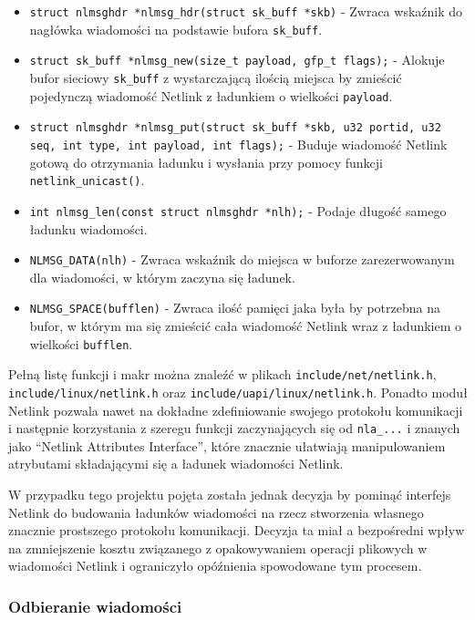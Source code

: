 \documentclass[10pt]{article}
\begin{document}
\begin{itemize}
\itemsep1pt\parskip0pt
\item
  \texttt{struct nlmsghdr *nlmsg\_hdr(struct sk\_buff *skb)} - Zwraca wskaźnik do nagłówka wiadomości na podstawie bufora \texttt{sk\_buff}.
\item
  \texttt{struct sk\_buff *nlmsg\_new(size\_t payload, gfp\_t flags);} - Alokuje bufor sieciowy \texttt{sk\_buff} z wystarczającą ilością miejsca by zmieścić pojedynczą wiadomość Netlink z ładunkiem o wielkości \texttt{payload}.
\item
  \texttt{struct nlmsghdr *nlmsg\_put(struct sk\_buff *skb, u32 portid, u32 seq, int type, int payload, int flags);} - Buduje wiadomość Netlink gotową do otrzymania ładunku i wysłania przy pomocy funkcji \texttt{netlink\_unicast()}.
\item
  \texttt{int nlmsg\_len(const struct nlmsghdr *nlh);} - Podaje długość samego ładunku wiadomości.
\item
  \texttt{NLMSG\_DATA(nlh)} - Zwraca wskaźnik do miejsca w buforze zarezerwowanym dla wiadomości, w którym zaczyna się ładunek.
\item
  \texttt{NLMSG\_SPACE(bufflen)} - Zwraca ilość pamięci jaka była by potrzebna na bufor, w którym ma się zmieścić cała wiadomość Netlink wraz z ładunkiem o wielkości \texttt{bufflen}.
\end{itemize}

Pełną listę funkcji i makr można znaleźć w plikach \texttt{include/net/netlink.h}, \texttt{include/linux/netlink.h} oraz \texttt{include/uapi/linux/netlink.h}. Ponadto moduł Netlink pozwala nawet na dokładne zdefiniowanie swojego protokołu komunikacji i następnie korzystania z szeregu funkcji zaczynających się od \texttt{nla\_...} i znanych jako ``Netlink Attributes Interface'', które znacznie ułatwiają manipulowaniem atrybutami składającymi się a ładunek wiadomości Netlink.

W przypadku tego projektu pojęta została jednak decyzja by pominąć interfejs Netlink do budowania ładunków wiadomości na rzecz stworzenia własnego znacznie prostszego protokołu komunikacji. Decyzja ta miał a bezpośredni wpływ na zmniejszenie kosztu związanego z opakowywaniem operacji plikowych w wiadomości Netlink i ograniczyło opóźnienia spowodowane tym procesem.

\subsubsection{Odbieranie wiadomości}
\end{document}
